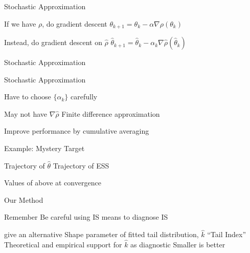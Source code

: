 \documentclass[14pt]{beamer}
\begin{document}
\begin{frame}{Stochastic Approximation}
    \begin{outline}
        \1 If we have $\rho$, do gradient descent
        \1 $\theta_{k+1} = \theta_k - \alpha \nabla \rho(\theta_k)$ \newline

        \1 Instead, do gradient descent on $\hat{\rho}$
        \1 $\hat{\theta}_{k+1} = \hat{\theta}_k - \alpha_k \nabla \hat{\rho}(\hat{\theta}_k)$ \newline

        \1 Stochastic Approximation
            \2 \citep{Rob51}
    \end{outline}
\end{frame}

\begin{frame}{Stochastic Approximation}
    \begin{outline}
        \1 Have to choose $\{ \alpha_k \}$ carefully \newline

        \1 May not have $\nabla \hat{\rho}$
            \2 Finite difference approximation
            \2 \citep{Kie52} \newline

        \1 Improve performance by cumulative averaging
    \end{outline}
\end{frame}



\begin{frame}{Example: Mystery Target}
    \begin{outline}
        \1 Trajectory of $\hat{\theta}$
        \1 Trajectory of ESS \newline

        \1 Values of above at convergence
    \end{outline}
\end{frame}

\begin{frame}{Our Method}
    \begin{outline}
        \1 Remember \citeauthor{Cha18}
            \2 Be careful using IS means to diagnose IS \newline
        
        \1 \citeauthor{Veh22} give an alternative
            \2 Shape parameter of fitted tail distribution, $\hat{k}$
            \2 ``Tail Index''
        \1 Theoretical and empirical support for $\hat{k}$ as diagnostic
            \2 Smaller is better
    \end{outline}
\end{frame}
\end{document}
